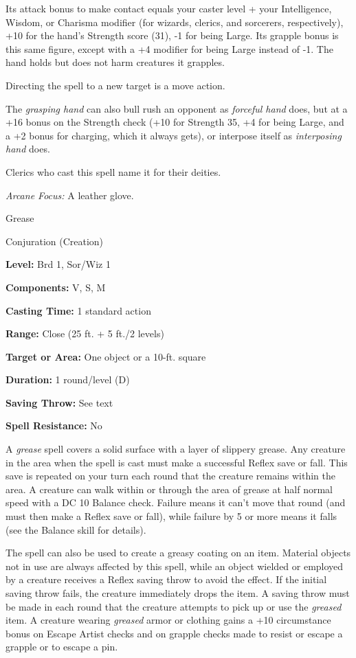 \documentclass{article}
\begin{document}
Its attack bonus to make contact equals your caster level + your Intelligence, 
Wisdom, or Charisma modifier (for wizards, clerics, and sorcerers, respectively), 
+10 for the hand's Strength score (31), -1 for being Large. Its grapple bonus is 
this same figure, except with a +4 modifier for being Large instead of -1. The 
hand holds but does not harm creatures it grapples.

Directing the spell to a new target is a move action.

The \textit{grasping hand }can also bull rush an opponent as \textit{forceful hand 
}does, but at a +16 bonus on the Strength check (+10 for Strength 35, +4 for being 
Large, and a +2 bonus for charging, which it always gets), or interpose itself 
as \textit{interposing hand }does.

Clerics who cast this spell name it for their deities.

\textit{Arcane Focus: }A leather glove.

\vspace{12pt}
Grease

Conjuration (Creation)

\textbf{Level:} Brd 1, Sor/Wiz 1

\textbf{Components:} V, S, M

\textbf{Casting Time:} 1 standard action

\textbf{Range:} Close (25 ft. + 5 ft./2 levels)

\textbf{Target or Area: }One object or a 10-ft. square

\textbf{Duration:} 1 round/level (D)

\textbf{Saving Throw:} See text

\textbf{Spell Resistance:} No

A \textit{grease }spell covers a solid surface with a layer of slippery grease. 
Any creature in the area when the spell is cast must make a successful Reflex save 
or fall. This save is repeated on your turn each round that the creature remains 
within the area. A creature can walk within or through the area of grease at half 
normal speed with a DC 10 Balance check. Failure means it can't move that round 
(and must then make a Reflex save or fall), while failure by 5 or more means it 
falls (see the Balance skill for details).

The spell can also be used to create a greasy coating on an item. Material objects 
not in use are always affected by this spell, while an object wielded or employed 
by a creature receives a Reflex saving throw to avoid the effect. If the initial 
saving throw fails, the creature immediately drops the item. A saving throw must 
be made in each round that the creature attempts to pick up or use the \textit{greased 
}item. A creature wearing \textit{greased }armor or clothing gains a +10 circumstance 
bonus on Escape Artist checks and on grapple checks made to resist or escape a 
grapple or to escape a pin.
\end{document}
